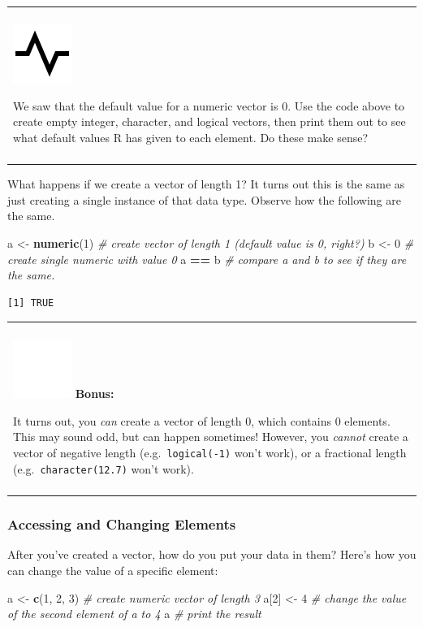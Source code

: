 \documentclass[
]{book}
\newenvironment{Shaded}{\begin{snugshade}}{\end{snugshade}}
\newcommand{\CommentTok}[1]{\textcolor[rgb]{0.56,0.35,0.01}{\textit{#1}}}
\newcommand{\DecValTok}[1]{\textcolor[rgb]{0.00,0.00,0.81}{#1}}
\newcommand{\KeywordTok}[1]{\textcolor[rgb]{0.13,0.29,0.53}{\textbf{#1}}}
\newcommand{\NormalTok}[1]{#1}
\newcommand{\OperatorTok}[1]{\textcolor[rgb]{0.81,0.36,0.00}{\textbf{#1}}}
\newcommand{\StringTok}[1]{\textcolor[rgb]{0.31,0.60,0.02}{#1}}
\newenvironment{bonus}
{
  \begin{center}
  \begin{tabular}{|>{\columncolor{bonus}\color{white}}p{0.9\textwidth}|}\hline\\
  \includegraphics[scale=0.1]{src/images/sun-fill-invert.png}
  \textbf{Bonus:}
}
{\\\\\hline
  \end{tabular}
  \end{center}
}
\newenvironment{progress}
{
  \begin{center}
  \begin{tabular}{|>{\columncolor{progress}}p{0.9\textwidth}|}
  \hline\\
  \includegraphics[scale=0.1]{src/images/pulse-line.png}
}
{\\\\\hline
  \end{tabular}
  \end{center}
}
\begin{document}
\begin{progress}
We saw that the default value for a numeric vector is 0. Use the code
above to create empty integer, character, and logical vectors, then
print them out to see what default values R has given to each element.
Do these make sense?
\end{progress}

What happens if we create a vector of length 1?
It turns out this is the same as just creating a single instance of that data type.
Observe how the following are the same.

\begin{Shaded}
\begin{Highlighting}[]
\NormalTok{a <-}\StringTok{ }\KeywordTok{numeric}\NormalTok{(}\DecValTok{1}\NormalTok{)  }\CommentTok{# create vector of length 1 (default value is 0, right?)}
\NormalTok{b <-}\StringTok{ }\DecValTok{0}           \CommentTok{# create single numeric with value 0}
\NormalTok{a }\OperatorTok{==}\StringTok{ }\NormalTok{b           }\CommentTok{# compare a and b to see if they are the same.}
\end{Highlighting}
\end{Shaded}

\begin{verbatim}
[1] TRUE
\end{verbatim}

\begin{bonus}
It turns out, you \emph{can} create a vector of length 0, which contains
0 elements. This may sound odd, but can happen sometimes! However, you
\emph{cannot} create a vector of negative length
(e.g.~\texttt{logical(-1)} won't work), or a fractional length
(e.g.~\texttt{character(12.7)} won't work).
\end{bonus}

\hypertarget{accessing-and-changing-elements}{%
\subsubsection{Accessing and Changing Elements}\label{accessing-and-changing-elements}}

After you've created a vector, how do you put your data in them?
Here's how you can change the value of a specific element:

\begin{Shaded}
\begin{Highlighting}[]
\NormalTok{a <-}\StringTok{ }\KeywordTok{c}\NormalTok{(}\DecValTok{1}\NormalTok{, }\DecValTok{2}\NormalTok{, }\DecValTok{3}\NormalTok{)  }\CommentTok{# create numeric vector of length 3}
\NormalTok{a[}\DecValTok{2}\NormalTok{] <-}\StringTok{ }\DecValTok{4}        \CommentTok{# change the value of the second element of a to 4}
\NormalTok{a                }\CommentTok{# print the result}
\end{Highlighting}
\end{Shaded}
\end{document}
